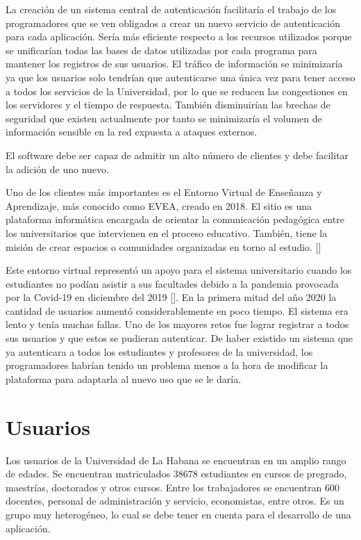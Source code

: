 La creación de un sistema central de autenticación facilitaría el trabajo de los programadores que se ven obligados a crear un nuevo servicio de autenticación para cada aplicación. Sería más eficiente respecto a los recursos utilizados porque se unificarían todas las bases de datos utilizadas por cada programa para mantener los registros de sus usuarios. El tráfico de información se minimizaría ya que los usuarios solo tendrían que autenticarse una única vez para tener acceso a todos los servicios de la Universidad, por lo que se reducen las congestiones en los servidores y el tiempo de respuesta. También disminuirían las brechas de seguridad que existen actualmente por tanto se minimizaría el volumen de información sensible en la red expuesta a ataques externos.

El software debe ser capaz de admitir un alto número de clientes y debe facilitar la adición de uno nuevo.

Uno de los clientes más importantes es el Entorno Virtual de Enseñanza y Aprendizaje, más conocido como EVEA, creado en 2018. El sitio es una plataforma informática encargada de orientar la comunicación pedagógica entre los universitarios que intervienen en el proceso educativo. También, tiene la misión de crear espacios o comunidades organizadas en torno al estudio. [\cite{evea-cd}] 

Este entorno virtual representó un apoyo para el sistema universitario cuando los estudiantes no podían asistir a sus facultades debido a la pandemia provocada por la Covid-19 en diciembre del 2019 [\cite{ferrer2020pandemia}]. En la primera mitad del año 2020 la cantidad de usuarios aumentó considerablemente en poco tiempo. El sistema era lento y tenía muchas fallas. Uno de los mayores retos fue lograr registrar a todos sus usuarios y que estos se pudieran autenticar. De haber existido un sistema que ya autenticara a todos los estudiantes y profesores de la universidad, los programadores habrían tenido un problema menos a la hora de modificar la plataforma para adaptarla al nuevo uso que se le daría.

\section*{Usuarios}

Los usuarios de la Universidad de La Habana se encuentran en un amplio rango de edades. Se encuentran matriculados $38 678$ estudiantes en cursos de pregrado, maestrías, doctorados y otros cursos. Entre los trabajadores se encuentran $600$ docentes, personal de administración y servicio, economistas, entre otros. Es un grupo muy heterogéneo, lo cual se debe tener en cuenta para el desarrollo de una aplicación.

